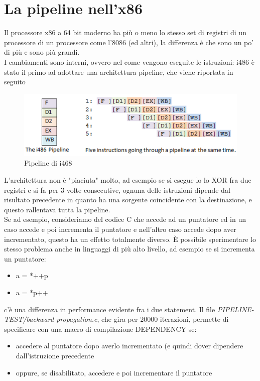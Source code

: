 \documentclass[12pt, oneside]{extbook}
\begin{document}
\section{La pipeline nell'x86}
Il processore x86 a 64 bit moderno ha più o meno lo stesso set di registri di un processore di un processore come l'8086 (ed altri), la differenza è che sono un po' di più e sono più grandi.\\ I cambiamenti sono interni, ovvero nel come vengono eseguite le istruzioni: i486 è stato il primo ad adottare una architettura pipeline, che viene riportata in seguito
\begin{figure}[ht!]
\includegraphics[scale=0.4]{immagini/pipeline-i486}
\caption{Pipeline di i468}
\end{figure}
L'architettura non è "piaciuta" molto, ad esempio se si esegue lo lo XOR fra due registri e si fa per 3 volte consecutive, ognuna delle istruzioni dipende dal risultato precedente in quanto ha una sorgente coincidente con la destinazione, e questo rallentava tutta la pipeline.\\ Se ad esempio, consideriamo del codice C che accede ad un puntatore ed in un caso accede e poi incrementa il puntatore e nell'altro caso accede dopo aver incrementato, questo ha un effetto totalmente diverso. È possibile sperimentare lo stesso problema anche in linguaggi di più alto livello, ad esempio se si incrementa un puntatore:
\begin{itemize}
\item a = *++p
\item a = *p++
\end{itemize}
c'è una differenza in performance evidente fra i due statement. Il file \textit{PIPELINE-TEST/backward-propagation.c}, che gira per 20000 iterazioni, permette di specificare con una macro di compilazione DEPENDENCY se:
\begin{itemize}
\item accedere al puntatore dopo averlo incrementato (e quindi dover dipendere dall'istruzione precedente
\item oppure, se disabilitato, accedere e poi incrementare il puntatore
\end{itemize} 
\end{document}
